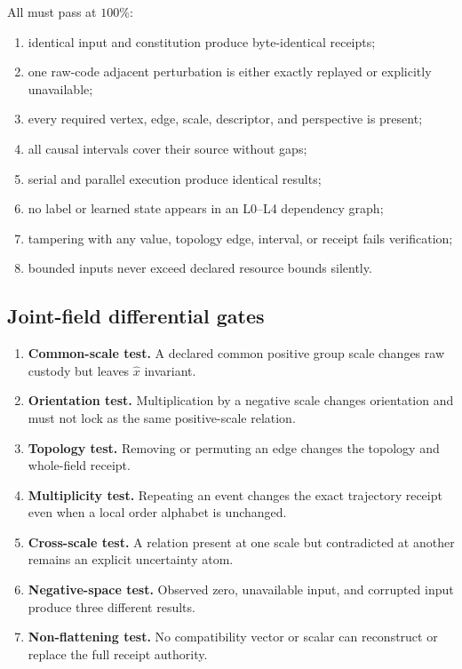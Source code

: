 \documentclass[11pt,oneside]{article}
\begin{document}
All must pass at \(100\%\):
\begin{enumerate}
  \item identical input and constitution produce byte-identical receipts;
  \item one raw-code adjacent perturbation is either exactly replayed or
  explicitly unavailable;
  \item every required vertex, edge, scale, descriptor, and perspective is
  present;
  \item all causal intervals cover their source without gaps;
  \item serial and parallel execution produce identical results;
  \item no label or learned state appears in an L0--L4 dependency graph;
  \item tampering with any value, topology edge, interval, or receipt fails
  verification;
  \item bounded inputs never exceed declared resource bounds silently.
\end{enumerate}

\subsection{Joint-field differential gates}

\begin{enumerate}
  \item \textbf{Common-scale test.} A declared common positive group scale
  changes raw custody but leaves \(\widehat{x}\) invariant.
  \item \textbf{Orientation test.} Multiplication by a negative scale changes
  orientation and must not lock as the same positive-scale relation.
  \item \textbf{Topology test.} Removing or permuting an edge changes the
  topology and whole-field receipt.
  \item \textbf{Multiplicity test.} Repeating an event changes the exact
  trajectory receipt even when a local order alphabet is unchanged.
  \item \textbf{Cross-scale test.} A relation present at one scale but
  contradicted at another remains an explicit uncertainty atom.
  \item \textbf{Negative-space test.} Observed zero, unavailable input, and
  corrupted input produce three different results.
  \item \textbf{Non-flattening test.} No compatibility vector or scalar can
  reconstruct or replace the full receipt authority.
\end{enumerate}
\end{document}
